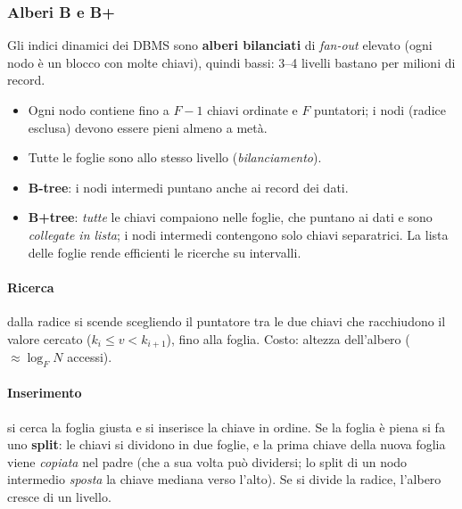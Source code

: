 \documentclass[a4paper,12pt]{article}
\begin{document}
\subsubsection{Alberi B e B+}

Gli indici dinamici dei DBMS sono \textbf{alberi bilanciati} di
\emph{fan-out} elevato (ogni nodo è un blocco con molte chiavi), quindi bassi:
3--4 livelli bastano per milioni di record.
\begin{itemize}
  \item Ogni nodo contiene fino a $F-1$ chiavi ordinate e $F$ puntatori; i nodi
    (radice esclusa) devono essere pieni almeno a metà.
  \item Tutte le foglie sono allo stesso livello (\emph{bilanciamento}).
  \item \textbf{B-tree}: i nodi intermedi puntano anche ai record dei dati.
  \item \textbf{B+tree}: \emph{tutte} le chiavi compaiono nelle foglie, che
    puntano ai dati e sono \emph{collegate in lista}; i nodi intermedi contengono
    solo chiavi separatrici. La lista delle foglie rende efficienti le ricerche
    su intervalli.
\end{itemize}

\paragraph{Ricerca} dalla radice si scende scegliendo il puntatore tra le due
chiavi che racchiudono il valore cercato ($k_i \le v < k_{i+1}$), fino alla
foglia. Costo: altezza dell'albero ($\approx \log_F N$ accessi).

\paragraph{Inserimento} si cerca la foglia giusta e si inserisce la chiave in
ordine. Se la foglia è piena si fa uno \textbf{split}: le chiavi si dividono in
due foglie, e la prima chiave della nuova foglia viene \emph{copiata} nel padre
(che a sua volta può dividersi; lo split di un nodo intermedio \emph{sposta} la
chiave mediana verso l'alto). Se si divide la radice, l'albero cresce di un
livello.
\end{document}

